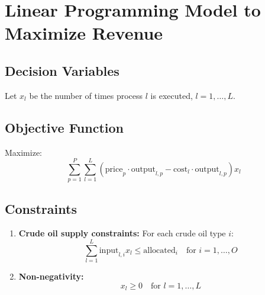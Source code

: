\documentclass{article}
\begin{document}
\section*{Linear Programming Model to Maximize Revenue}

\subsection*{Decision Variables}
Let \( x_l \) be the number of times process \( l \) is executed, \( l = 1, \ldots, L \).

\subsection*{Objective Function}
Maximize:
\[
\sum_{p=1}^{P} \sum_{l=1}^{L} \left( \text{price}_p \cdot \text{output}_{l,p} - \text{cost}_l \cdot \text{output}_{l,p} \right) x_l
\]

\subsection*{Constraints}
\begin{enumerate}
    \item \textbf{Crude oil supply constraints:} For each crude oil type \( i \):
    \[
    \sum_{l=1}^{L} \text{input}_{l,i} x_l \leq \text{allocated}_i \quad \text{for } i = 1, \ldots, O
    \]

    \item \textbf{Non-negativity:}
    \[
    x_l \geq 0 \quad \text{for } l = 1, \ldots, L
    \]
\end{enumerate}
\end{document}
